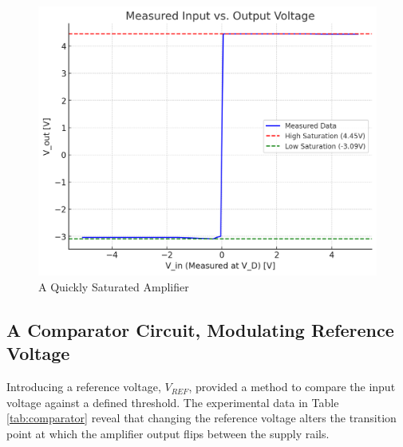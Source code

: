 \documentclass[12pt]{article}
\begin{document}
\begin{figure}[H]
	\centering
	\includegraphics[width=12cm]{03_exp1}
	\caption{A Quickly Saturated Amplifier}
	\label{fig:exp1}
\end{figure}

\subsection{A Comparator Circuit, Modulating Reference Voltage}
Introducing a reference voltage, $V_{REF}$, provided a method to compare the input voltage against a defined threshold. The experimental data in Table \ref{tab:comparator} reveal that changing the reference voltage alters the transition point at which the amplifier output flips between the supply rails.
\end{document}
